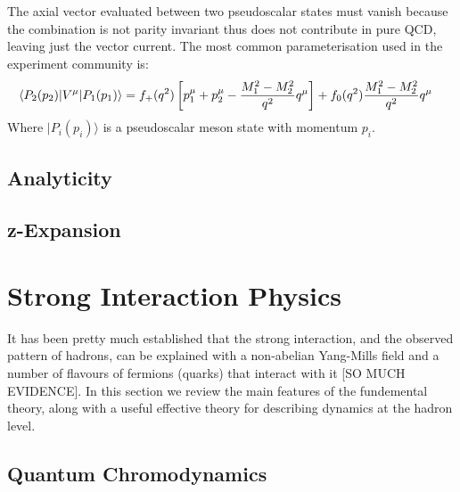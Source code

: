 \\ \\
The axial vector evaluated between two pseudoscalar states must vanish because the combination is not parity invariant thus does not contribute in pure QCD, leaving just the vector current. The most common parameterisation used in the experiment community is:
\begin{align}
\label{eq:formfactors}
\langle P_2 (p_2) | V^{\mu} | P_1 (p_1) \rangle  &= f_{+} (q^2) \left[ p_1^{\mu} + p_2^{\mu} - {M_1^2 - M_2^2 \over q^2} q^{\mu} \right] + f_0(q^2) {M_1^2 - M_2^2 \over q^2 } q^{\mu}
\end{align}
Where $|P_i(p_i)\rangle$ is a pseudoscalar meson state with momentum $p_i$.

\subsection{Analyticity}
\subsection{z-Expansion}


\section{Strong Interaction Physics}

It has been pretty much established that the strong interaction, and the observed pattern of hadrons, can be explained with a non-abelian Yang-Mills field and a number of flavours of fermions (quarks) that interact with it [SO MUCH EVIDENCE]. In this section we review the main features of the fundemental theory, along with a useful effective theory for describing dynamics at the hadron level. 

\subsection{Quantum Chromodynamics}

